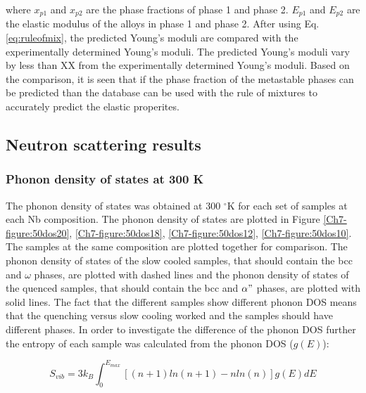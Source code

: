 \noindent where $x_{p1}$ and $x_{p2}$ are the phase fractions of phase 1 and phase 2. $E_{p1}$ and $E_{p2}$ are the elastic modulus of the alloys in phase 1 and phase 2. After using Eq. \ref{eq:ruleofmix}, the predicted Young's moduli are compared with the experimentally determined Young's moduli. The predicted Young's moduli vary by less than XX from the experimentally determined Young's moduli. Based on the comparison, it is seen that if the phase fraction of the metastable phases can be predicted than the database can be used with the rule of mixtures to accurately predict the elastic properites. 

\subsection{Neutron scattering results}

\subsubsection{Phonon density of states at 300 K}

The phonon density of states was obtained at 300 $^\circ$K for each set of samples at each Nb composition. The phonon density of states are plotted in Figure \ref{Ch7-figure:50dos20}, \ref{Ch7-figure:50dos18}, \ref{Ch7-figure:50dos12}, \ref{Ch7-figure:50dos10}. The samples at the same composition are plotted together for comparison. The phonon density of states of the slow cooled samples, that should contain the bcc and $\omega$ phases, are plotted with dashed lines and the phonon density of states of the quenced samples, that should contain the bcc and $\alpha "$ phases, are plotted with solid lines. The fact that the different samples show different phonon DOS means that the quenching versus slow cooling worked and the samples should have different phases. In order to investigate the difference of the phonon DOS further the entropy of each sample was calculated from the phonon DOS ($g(E)$):

\begin{equation}
\label{eq:phononentropy}
S_{vib} = 3 k_{B} \int_{0}^{E_{max}} \left[ \left( n+1 \right) ln\left(n+1\right) -n ln\left(n\right) \right] g(E) dE
\end{equation}

